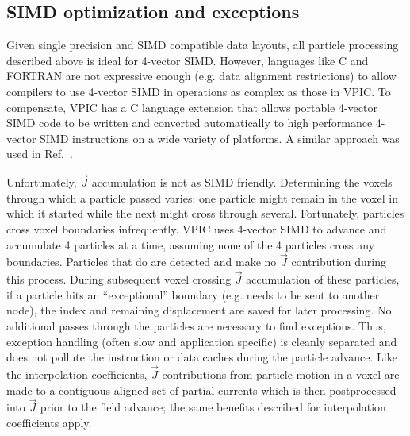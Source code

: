 \documentclass[journal,twoside]{IEEEtran}
\newcommand{\vecJ}{\vec{J}}
\begin{document}
\subsection{SIMD optimization and exceptions}

Given single precision and SIMD compatible data layouts, all particle
processing described above is ideal for 4-vector SIMD.  However,
languages like C and FORTRAN are not expressive enough (e.g. data
alignment restrictions) to allow compilers to use 4-vector SIMD in
operations as complex as those in VPIC.  To compensate, VPIC has a C
language extension that allows portable 4-vector SIMD code to be
written and converted automatically to high performance 4-vector SIMD
instructions on a wide variety of platforms.  A similar approach was
used in Ref.~\cite{Bowers_et_al_2006}.


Unfortunately, $\vecJ$ accumulation is not as SIMD friendly.
Determining the voxels through which a particle passed varies: one
particle might remain in the voxel in which it started while the next
might cross through several.  Fortunately, particles cross voxel
boundaries infrequently.  VPIC uses 4-vector SIMD to advance and
accumulate 4 particles at a time, assuming none of the 4 particles
cross any boundaries.  Particles that do are detected and make no
$\vecJ$ contribution during this process.  During subsequent voxel
crossing $\vecJ$ accumulation of these particles, if a particle hits
an ``exceptional'' boundary (e.g. needs to be sent to another node),
the index and remaining displacement are saved for later processing.
No additional passes through the particles are necessary to find
exceptions.  Thus, exception handling (often slow and application
specific) is cleanly separated and does not pollute the instruction or
data caches during the particle advance.  Like the interpolation
coefficients, $\vecJ$ contributions from particle motion in a voxel
are made to a contiguous aligned set of partial currents which is then
postprocessed into $\vecJ$ prior to the field advance; the same
benefits described for interpolation coefficients apply.
\end{document}
